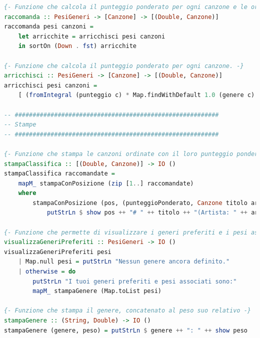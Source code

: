 \documentclass[a4paper,11pt]{article}
\begin{document}
\begin{lstlisting}[language=Haskell]
{- Funzione che calcola il punteggio ponderato per ogni canzone e le ordina. -}
raccomanda :: PesiGeneri -> [Canzone] -> [(Double, Canzone)]
raccomanda pesi canzoni =
    let arricchite = arricchisci pesi canzoni
    in sortOn (Down . fst) arricchite

{- Funzione che calcola il punteggio ponderato per ogni canzone. -}
arricchisci :: PesiGeneri -> [Canzone] -> [(Double, Canzone)]
arricchisci pesi canzoni =
    [ (fromIntegral (punteggio c) * Map.findWithDefault 1.0 (genere c) pesi, c) | c <- canzoni ]

-- #########################################################
-- Stampe
-- #########################################################

{- Funzione che stampa le canzoni ordinate con il loro punteggio ponderato. -}
stampaClassifica :: [(Double, Canzone)] -> IO ()
stampaClassifica raccomandate =
    mapM_ stampaConPosizione (zip [1..] raccomandate)
    where
        stampaConPosizione (pos, (punteggioPonderato, Canzone titolo artista genere _)) = do
            putStrLn $ show pos ++ "# " ++ titolo ++ "(Artista: " ++ artista ++ ", Genere: " ++ genere ++ ", Punteggio Ponderato: " ++ show punteggioPonderato

{- Funzione che permette di visualizzare i generi preferiti e i pesi associati. -}
visualizzaGeneriPreferiti :: PesiGeneri -> IO ()
visualizzaGeneriPreferiti pesi
    | Map.null pesi = putStrLn "Nessun genere ancora definito."
    | otherwise = do
        putStrLn "I tuoi generi preferiti e pesi associati sono:"
        mapM_ stampaGenere (Map.toList pesi)

{- Funzione che stampa il genere, concatenato al peso suo relativo -}
stampaGenere :: (String, Double) -> IO ()
stampaGenere (genere, peso) = putStrLn $ genere ++ ": " ++ show peso

\end{lstlisting}

\newpage
\end{document}
